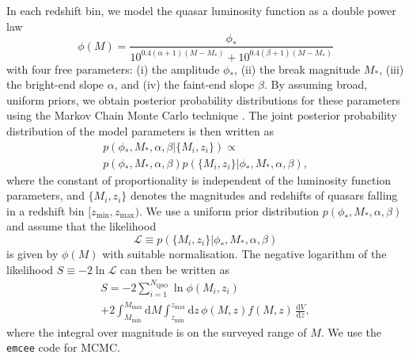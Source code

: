 \documentclass[fleqn,usenatbib]{mnras}
\begin{document}
In each redshift bin, we model the quasar
luminosity function as a double power law 
\citep[e.g.][]{1988MNRAS.235..935B}
\begin{equation}
  \phi(M) =
  \frac{\phi_*}{10^{0.4(\alpha+1)(M-M_*)}+10^{0.4(\beta+1)(M-M_*)}}
  \label{eqn:dpl}
\end{equation}
with four free parameters: (i) the amplitude $\phi_*$, (ii) the break magnitude $M_*$,
(iii)  the bright-end slope $\alpha$, and (iv) the faint-end slope $\beta$.
By assuming broad, uniform priors, we obtain posterior probability
distributions for these parameters using the Markov Chain Monte Carlo technique \citep[MCMC, e.g.,][]{jaynes}.
The joint posterior probability distribution of the model parameters
is then written as
\begin{multline}
  p(\phi_*, M_*, \alpha, \beta | \{M_i, z_i\}) \propto \\ p(\phi_*, M_*,
  \alpha, \beta)p(\{M_i, z_i\} | \phi_*, M_*, \alpha, \beta),
\end{multline}
where the constant of proportionality is independent of the luminosity
function parameters, and $\{M_i, z_i\}$ denotes the magnitudes and
redshifts of quasars falling in a redshift bin $[z_\mathrm{min},
  z_\mathrm{max})$.  We use a uniform prior distribution $p(\phi_*,
  M_*, \alpha, \beta)$ and assume that the likelihood
\begin{equation}
  \mathcal{L}\equiv p(\{M_i, z_i\} | \phi_*, M_*, \alpha, \beta)
\end{equation}
is given by $\phi(M)$
with suitable normalisation.  The negative
logarithm of the likelihood $S\equiv -2\ln\mathcal{L}$ can then be
written as
\begin{multline}
  S = -2\sum_{i=1}^{N_\mathrm{QSO}}\ln\phi(M_i, z_i)\\+2\int_{M_\mathrm{min}}^{M_\mathrm{max}}\mathrm{d}M
  \int_{z_\mathrm{min}}^{z_\mathrm{max}}\mathrm{d}z\, \phi(M,z) f(M, z)\,\frac{\mathrm{d}V}{\mathrm{d}z},
  \label{eqn:S}
\end{multline}
where the integral over magnitude is on the surveyed range of $M$.  We
use the \texttt{emcee} code \citep{2013PASP..125..306F} for MCMC.
\end{document}
